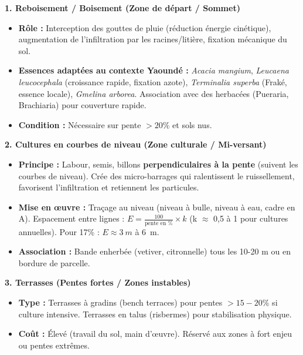 \documentclass[11pt]{article}
\begin{document}
\begin{aretenir}
\textbf{1. Reboisement / Boisement (Zone de départ / Sommet)}
\begin{itemize}
    \item \textbf{Rôle :} Interception des gouttes de pluie (réduction énergie cinétique), augmentation de l'infiltration par les racines/litière, fixation mécanique du sol.
    \item \textbf{Essences adaptées au contexte Yaoundé :} \emph{Acacia mangium}, \emph{Leucaena leucocephala} (croissance rapide, fixation azote), \emph{Terminalia superba} (Fraké, essence locale), \emph{Gmelina arborea}. Association avec des herbacées (Pueraria, Brachiaria) pour couverture rapide.
    \item \textbf{Condition :} Nécessaire sur pente $> 20\%$ et sols nus.
\end{itemize}

\textbf{2. Cultures en courbes de niveau (Zone culturale / Mi-versant)}
\begin{itemize}
    \item \textbf{Principe :} Labour, semis, billons \textbf{perpendiculaires à la pente} (suivent les courbes de niveau). Crée des micro-barrages qui ralentissent le ruissellement, favorisent l'infiltration et retiennent les particules.
    \item \textbf{Mise en œuvre :} Traçage au niveau (niveau à bulle, niveau à eau, cadre en A). Espacement entre lignes : $E = \frac{100}{\text{pente en \%}} \times k$ (k $\approx$ 0,5 à 1 pour cultures annuelles). Pour 17\% : $E \approx \SI{3}{m}$ à \SI{6}{m}.
    \item \textbf{Association :} Bande enherbée (vetiver, citronnelle) tous les 10-20 m ou en bordure de parcelle.
\end{itemize}

\textbf{3. Terrasses (Pentes fortes / Zones instables)}
\begin{itemize}
    \item \textbf{Type :} Terrasses à gradins (bench terraces) pour pentes $> 15-20\%$ si culture intensive. Terrasses en talus (risbermes) pour stabilisation physique.
    \item \textbf{Coût :} Élevé (travail du sol, main d'œuvre). Réservé aux zones à fort enjeu ou pentes extrêmes.
\end{itemize}


\end{aretenir}
\end{document}
